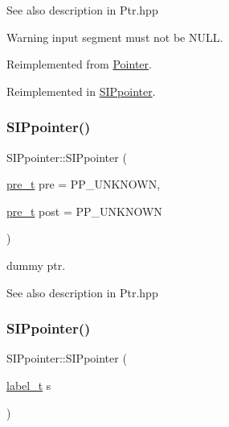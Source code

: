 \begin{DoxySeeAlso}{See also}
description in Ptr.\+hpp 
\end{DoxySeeAlso}
\begin{DoxyWarning}{Warning}
input segment must not be N\+U\+LL. 
\end{DoxyWarning}


Reimplemented from \mbox{\hyperlink{group__table_ga4ca596fe52abd36d550a10818678d54c}{Pointer}}.



Reimplemented in \mbox{\hyperlink{group__table_ga01caac75d66ff2e272a248c7e1954415}{S\+I\+Ppointer}}.

\mbox{\label{group__table_gac498892cd08ebd0663899dc82b00fac6}} 
\subsubsection{\texorpdfstring{SIPpointer()}{SIPpointer()}\hspace{0.1cm}{\footnotesize\ttfamily [1/7]}}
{\footnotesize\ttfamily S\+I\+Ppointer\+::\+S\+I\+Ppointer (\begin{DoxyParamCaption}\item[{\mbox{\hyperlink{group__general_ga092fe8b972dfa977c2a0886720a7731e}{pre\+\_\+t}}}]{pre = {\ttfamily PP\+\_\+UNKNOWN},  }\item[{\mbox{\hyperlink{group__general_ga092fe8b972dfa977c2a0886720a7731e}{pre\+\_\+t}}}]{post = {\ttfamily PP\+\_\+UNKNOWN} }\end{DoxyParamCaption})}



dummy ptr. 

\begin{DoxySeeAlso}{See also}
description in Ptr.\+hpp 
\end{DoxySeeAlso}
\mbox{\label{group__table_gafcef62ae9e6a74448beec7ac040f6d7c}} 
\subsubsection{\texorpdfstring{SIPpointer()}{SIPpointer()}\hspace{0.1cm}{\footnotesize\ttfamily [2/7]}}
{\footnotesize\ttfamily S\+I\+Ppointer\+::\+S\+I\+Ppointer (\begin{DoxyParamCaption}\item[{\mbox{\hyperlink{group__output_ga22fde970e635fcf63962743b2d5c441d}{label\+\_\+t}}}]{s }\end{DoxyParamCaption})}



